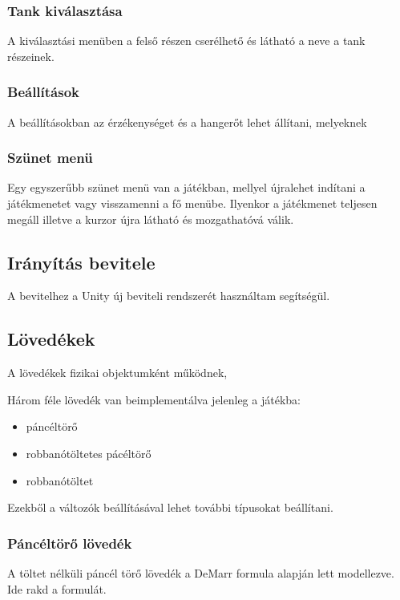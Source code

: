\documentclass[
]{thesis-ekf}
\theoremstyle{definition}
\theoremstyle{remark}
\begin{document}
\subsubsection{Tank kiválasztása}

A kiválasztási menüben a felső részen cserélhető és látható a neve a tank részeinek.

\subsubsection{Beállítások}

A beállításokban az érzékenységet és a hangerőt lehet állítani, melyeknek

\subsubsection{Szünet menü}

Egy egyszerűbb szünet menü van a játékban, mellyel újralehet indítani a játékmenetet vagy visszamenni a fő menübe. Ilyenkor a játékmenet teljesen megáll illetve a kurzor újra látható és mozgathatóvá válik.

\subsection{Irányítás bevitele}

A bevitelhez a Unity új beviteli rendszerét használtam segítségül.


\subsection{Lövedékek}

A lövedékek fizikai objektumként működnek,

Három féle lövedék van beimplementálva jelenleg a játékba:
\begin{itemize}
    \item páncéltörő
    \item robbanótöltetes pácéltörő
    \item robbanótöltet
\end{itemize}

Ezekből a változók beállításával lehet további típusokat beállítani.

\subsubsection{Páncéltörő lövedék}

A töltet nélküli páncél törő lövedék a DeMarr formula alapján lett modellezve. Ide rakd a formulát.
\end{document}
